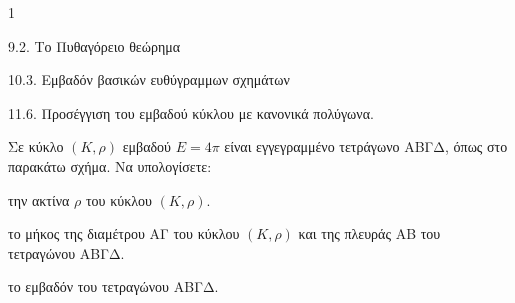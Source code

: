 \begin{ylh}{1}
    \item 9.2. Το Πυθαγόρειο θεώρημα
    \item 10.3. Εμβαδόν βασικών ευθύγραμμων σχημάτων
    \item 11.6. Προσέγγιση του εμβαδού κύκλου με κανονικά πολύγωνα.
\end{ylh}
\begin{figure} %
    \centering
\end{figure}

Σε κύκλο $(K, \rho)$ εμβαδού $E = 4\pi$ είναι εγγεγραμμένο τετράγωνο ΑΒΓΔ, όπως στο παρακάτω σχήμα. Να υπολογίσετε:
\begin{alist}
    \item την ακτίνα $\rho$ του κύκλου $(K, \rho)$. 
    \item το μήκος της διαμέτρου ΑΓ του κύκλου $(K, \rho)$ και της πλευράς ΑΒ του τετραγώνου ΑΒΓΔ. 
    \item το εμβαδόν του τετραγώνου ΑΒΓΔ. 
\end{alist}
